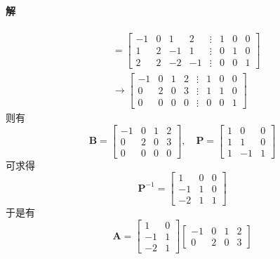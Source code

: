 \paragraph*{解}
\begin{align*}
    [\bm{A} \vdots \bm{I}] & = \begin{bmatrix}
                                   -1 & 0 & 1  & 2  & \vdots & 1 & 0 & 0 \\
                                   1  & 2 & -1 & 1  & \vdots & 0 & 1 & 0 \\
                                   2  & 2 & -2 & -1 & \vdots & 0 & 0 & 1
                               \end{bmatrix} \\
                           & \to \begin{bmatrix}
                                     -1 & 0 & 1 & 2 & \vdots & 1 & 0 & 0 \\
                                     0  & 2 & 0 & 3 & \vdots & 1 & 1 & 0 \\
                                     0  & 0 & 0 & 0 & \vdots & 0 & 0 & 1
                                 \end{bmatrix}
\end{align*}
则有
$$
    \bm{B} = \begin{bmatrix}
        -1 & 0 & 1 & 2 \\
        0  & 2 & 0 & 3 \\
        0  & 0 & 0 & 0
    \end{bmatrix}, \quad
    \bm{P} = \begin{bmatrix}
        1 & 0  & 0 \\
        1 & 1  & 0 \\
        1 & -1 & 1
    \end{bmatrix}
$$
可求得
$$
    \bm{P}^{-1} = \begin{bmatrix}
        1  & 0 & 0 \\
        -1 & 1 & 0 \\
        -2 & 1 & 1
    \end{bmatrix}
$$
于是有
$$
    \bm{A} = \begin{bmatrix}
        1  & 0 \\
        -1 & 1 \\
        -2 & 1
    \end{bmatrix} \begin{bmatrix}
        -1 & 0 & 1 & 2 \\
        0  & 2 & 0 & 3
    \end{bmatrix}
$$

